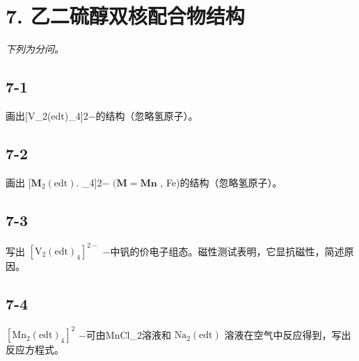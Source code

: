 \section*{7. 乙二硫醇双核配合物结构}
\textit{下列为分问。}

\subsection*{7-1}
画出[V_{2}(edt)_{4}]2−的结构（忽略氢原⼦）。

\subsection*{7-2}
画出 $[ \mathbf { M } _ { 2 } ( \mathrm { e d t } ) .$ _{4}]2− $( \mathbf { M } = \mathbf { M } \mathbf { n }$ , Fe)的结构（忽略氢原⼦）。

\subsection*{7-3}
写出 $\mathrm { [ V _ { 2 } ( e d t ) _ { 4 } ] ^ { 2 - } }$ −中钒的价电⼦组态。磁性测试表明，它显抗磁性，简述原因。

\subsection*{7-4}
$\mathrm { [ M n _ { 2 } ( e d t ) _ { 4 } ] ^ { 2 } }$ −可由MnCl_{2}溶液和 $\mathrm { N a } _ { 2 } ( \mathrm { e d t } )$ 溶液在空⽓中反应得到，写出反应⽅程式。
